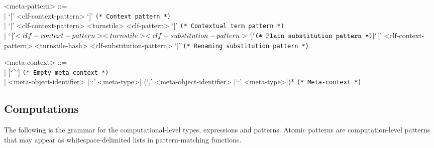 \documentclass[11pt]{article}
\begin{document}
\begin{grammar}
<meta-pattern> ::= \hfill\\
| `[' <clf-context-pattern> `]' \hfill \texttt{(* Context pattern *)}\\
| `[' <clf-context-pattern> <turnstile> <clf-pattern> `]' \hfill \texttt{(* Contextual term pattern *)}\\
| `$[' <clf-context-pattern> <turnstile> <clf-substitution-pattern> `]' \hfill \texttt{(* Plain substitution pattern *)}\\
| `$[' <clf-context-pattern> <turnstile-hash> <clf-substitution-pattern> `]' \hfill \texttt{(* Renaming substitution pattern *)}

<meta-context> ::= \hfill\\
| [`^'] \hfill \texttt{(* Empty meta-context *)}\\
| <meta-object-identifier> [`:' <meta-type>] (`,' <meta-object-identifier> [`:' <meta-type>])* \hfill \texttt{(* Meta-context *)}
\end{grammar}

\subsection{Computations}\label{section:syntax-computations}

The following is the grammar for the computational-level types, expressions and patterns.
Atomic patterns are computation-level patterns that may appear as whitespace-delimited lists in pattern-matching functions.
\end{document}
